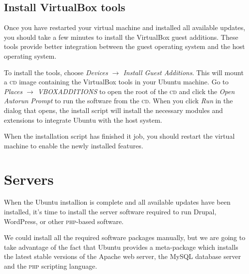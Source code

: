 \documentclass[final,ebook,10pt,twoside,openright]{memoir}
\begin{document}
\section{Install VirtualBox tools}
\label{sec:Install VirtualBox tools}

Once you have restarted your virtual machine and installed all available updates, you should take a few minutes to install the VirtualBox guest additions. These tools provide better integration between the guest operating system and the host operating system.

To install the tools, choose \emph{Devices $\rightarrow$ Install Guest Additions}. This will mount a \textsc{cd} image containing the VirtualBox tools in your Ubuntu machine. Go to \emph{Places $\rightarrow$ VBOXADDITIONS} to open the root of the \textsc{cd} and click the \emph{Open Autorun Prompt} to run the software from the \textsc{cd}. When you click \emph{Run} in the dialog that opens, the install script will install the necessary modules and extensions to integrate Ubuntu with the host system.

When the installation script has finished it job, you should restart the virtual machine to enable the newly installed features.



\chapter{Servers} %
\label{cha:Servers}

\noindent
When the Ubuntu installion is complete and all available updates have been installed, it’s time to install the server software required to run Drupal, WordPress, or other \textsc{php}-based software.

We could install all the required software packages manually, but we are going to take advantage of the fact that Ubuntu provides a meta-package which installs the latest stable versions of the Apache web server, the MySQL database server and the \textsc{php} scripting language.
\end{document}
